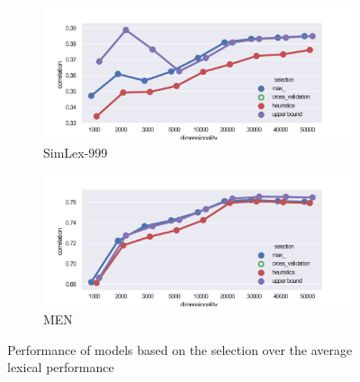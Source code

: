 \begin{figure}
  \centering

  \begin{subfigure}[t]{0.49\textwidth}
    \includegraphics[width=\textwidth]{supplement/figures/lexical-results-SimLex999}
    \caption{SimLex-999}
    \label{fig:lexical-results-simlex}
  \end{subfigure}
  \begin{subfigure}[t]{0.49\textwidth}
    \includegraphics[width=\textwidth]{supplement/figures/lexical-results-men}
    \caption{MEN}
    \label{fig:lexical-results-men}
  \end{subfigure}

  \caption{Performance of models based on the selection over the average lexical performance}
  \label{fig:lexical-results}
\end{figure}

